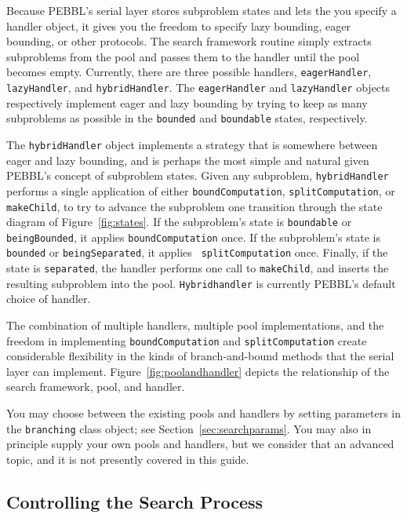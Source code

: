 Because PEBBL's serial layer stores subproblem states and lets the
you specify a handler object, it gives you the freedom to specify
lazy bounding, eager bounding, or other protocols.  The search
framework routine simply extracts subproblems from the pool and passes
them to the handler until the pool becomes empty.  Currently, there
are three possible handlers, \texttt{eagerHandler},
\texttt{lazyHandler}, and \texttt{hybridHandler}.  The
\texttt{eagerHandler} and \texttt{lazyHandler} 
objects respectively implement eager
and lazy bounding by trying to keep as many subproblems
as possible in the \texttt{bounded} and \texttt{boundable} states,
respectively.

The \texttt{hybridHandler} object implements a strategy that is somewhere
between eager and lazy bounding, and is perhaps the most simple and
natural given PEBBL's concept of subproblem states.  Given any
subproblem, \texttt{hybridHandler} performs a single application of
either \texttt{boundComputation}, \texttt{splitComputation}, or
\texttt{makeChild}, to try to advance the subproblem one transition
through the state diagram of Figure~\ref{fig:states}.  
If the subproblem's state is
\texttt{boundable} or \texttt{beingBounded}, it applies
\texttt{boundComputation} once.  If the subproblem's state is
\texttt{bounded} or \texttt{beingSeparated}, it applies {\tt
splitComputation} once.  Finally, if the state is \texttt{separated},
the handler performs one call to \texttt{makeChild}, and inserts the
resulting subproblem into the pool.  \texttt{Hybridhandler} is currently
PEBBL's default choice of handler.

The combination of multiple handlers, multiple pool implementations,
and the freedom in implementing \texttt{boundComputation} and
\texttt{splitComputation} create considerable flexibility in the kinds
of branch-and-bound methods that the serial layer can implement.
Figure~\ref{fig:poolandhandler} depicts the relationship of the search
framework, pool, and handler.

You may choose between the existing pools and handlers by setting
parameters in the \texttt{branching} class object; see
Section~\ref{sec:searchparams}.  You may also in principle supply
your own pools and handlers, but we consider that an advanced topic,
and it is not presently covered in this guide.


\subsection{Controlling the Search Process}

